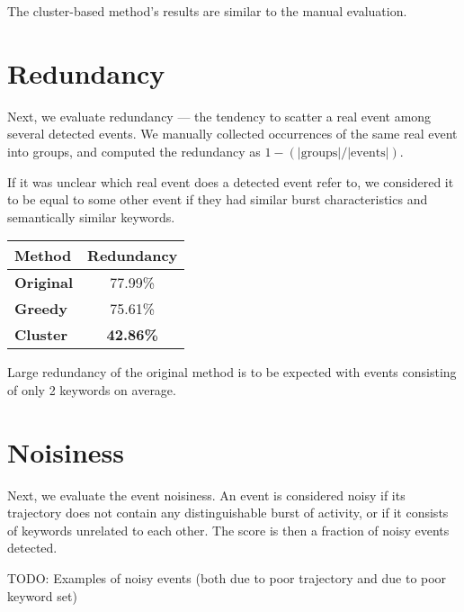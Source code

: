 The cluster-based method's results are similar to the manual evaluation.

\section{Redundancy}

Next, we evaluate redundancy --- the tendency to scatter a real event among several detected events. We manually collected occurrences of the same real event into groups, and computed the redundancy as $1 - (\left| \text{groups} \right| / \left| \text{events} \right|)$.

If it was unclear which real event does a detected event refer to, we considered it to be equal to some other event if they had similar burst characteristics and semantically similar keywords.

\hspace{\fill}

\begin{minipage}{\linewidth}
\centering
\begin{tabular}{ l c }\toprule[1.5pt]
\bf Method 	 & \bf Redundancy \\ \midrule
\bf Original &  77.99\% \\
\bf Greedy   &  75.61\% \\
\bf Cluster &  \bf 42.86\% \\ \bottomrule[1.25pt]
\end {tabular}\par
{} \label{tab:title} 
\end{minipage}

\hspace{\fill}

Large redundancy of the original method is to be expected with events consisting of only 2 keywords on average.

\section{Noisiness}

Next, we evaluate the event noisiness. An event is considered noisy if its trajectory does not contain any distinguishable burst of activity, or if it consists of keywords unrelated to each other. The score is then a fraction of noisy events detected.

{\color{red} TODO: Examples of noisy events (both due to poor trajectory and due to poor keyword set)}

